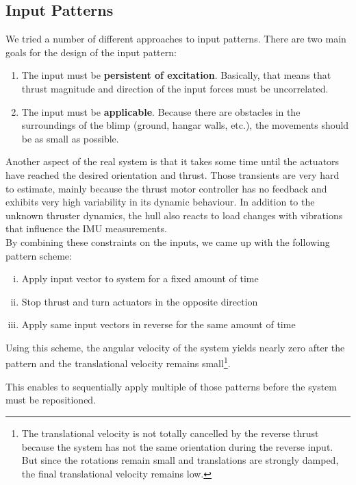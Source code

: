 \subsection{Input Patterns}
\label{sub:input_pattern}
We tried a number of different approaches to input patterns.
There are two main goals for the design of the input pattern:
\begin{enumerate}
\item The input must be \textbf{persistent of excitation}. Basically, that means that thrust magnitude and direction of the input forces must be uncorrelated.
\item The input must be \textbf{applicable}. Because there are obstacles in the surroundings of the blimp (ground, hangar walls, etc.), the movements should be as small as possible.
\end{enumerate}

Another aspect of the real system is that it takes some time until the actuators have reached the desired orientation and thrust.
Those transients are very hard to estimate, mainly because the thrust motor controller has no feedback and exhibits very high variability in its dynamic behaviour.
In addition to the unknown thruster dynamics, the hull also reacts to load changes with vibrations that influence the IMU measurements. \\

By combining these constraints on the inputs, we came up with the following pattern scheme:
\begin{enumerate}[(i)]
\item Apply input vector to system for a fixed amount of time
\item Stop thrust and turn actuators in the opposite direction
\item Apply same input vectors in reverse for the same amount of time
\end{enumerate}
Using this scheme, the angular velocity of the system yields nearly zero after the pattern and the translational velocity remains small\footnote{The translational velocity is not totally cancelled by the reverse thrust because the system has not the same orientation during the reverse input.
But since the rotations remain small and translations are strongly damped, the final translational velocity remains low.
}.

This enables to sequentially apply multiple of those patterns before the system must be repositioned.
\\


